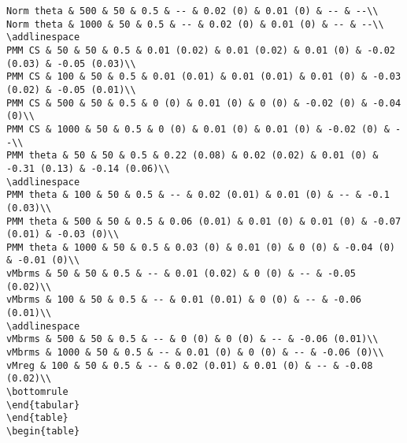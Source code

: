 \documentclass[
]{article}
\begin{document}
\begin{verbatim}
Norm theta & 500 & 50 & 0.5 & -- & 0.02 (0) & 0.01 (0) & -- & --\\
Norm theta & 1000 & 50 & 0.5 & -- & 0.02 (0) & 0.01 (0) & -- & --\\
\addlinespace
PMM CS & 50 & 50 & 0.5 & 0.01 (0.02) & 0.01 (0.02) & 0.01 (0) & -0.02 (0.03) & -0.05 (0.03)\\
PMM CS & 100 & 50 & 0.5 & 0.01 (0.01) & 0.01 (0.01) & 0.01 (0) & -0.03 (0.02) & -0.05 (0.01)\\
PMM CS & 500 & 50 & 0.5 & 0 (0) & 0.01 (0) & 0 (0) & -0.02 (0) & -0.04 (0)\\
PMM CS & 1000 & 50 & 0.5 & 0 (0) & 0.01 (0) & 0.01 (0) & -0.02 (0) & --\\
PMM theta & 50 & 50 & 0.5 & 0.22 (0.08) & 0.02 (0.02) & 0.01 (0) & -0.31 (0.13) & -0.14 (0.06)\\
\addlinespace
PMM theta & 100 & 50 & 0.5 & -- & 0.02 (0.01) & 0.01 (0) & -- & -0.1 (0.03)\\
PMM theta & 500 & 50 & 0.5 & 0.06 (0.01) & 0.01 (0) & 0.01 (0) & -0.07 (0.01) & -0.03 (0)\\
PMM theta & 1000 & 50 & 0.5 & 0.03 (0) & 0.01 (0) & 0 (0) & -0.04 (0) & -0.01 (0)\\
vMbrms & 50 & 50 & 0.5 & -- & 0.01 (0.02) & 0 (0) & -- & -0.05 (0.02)\\
vMbrms & 100 & 50 & 0.5 & -- & 0.01 (0.01) & 0 (0) & -- & -0.06 (0.01)\\
\addlinespace
vMbrms & 500 & 50 & 0.5 & -- & 0 (0) & 0 (0) & -- & -0.06 (0.01)\\
vMbrms & 1000 & 50 & 0.5 & -- & 0.01 (0) & 0 (0) & -- & -0.06 (0)\\
vMreg & 100 & 50 & 0.5 & -- & 0.02 (0.01) & 0.01 (0) & -- & -0.08 (0.02)\\
\bottomrule
\end{tabular}
\end{table}
\begin{table}


\end{verbatim}
\end{document}
